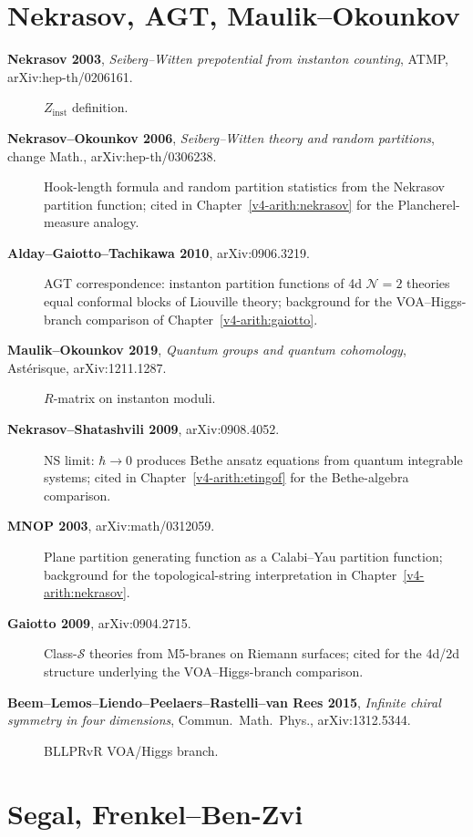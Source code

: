\section{Nekrasov, AGT, Maulik--Okounkov}
\label{v4-arith:app:A:nekrasov}

\begin{description}
\item[\textbf{Nekrasov 2003}, \emph{Seiberg--Witten prepotential from
instanton counting}, ATMP, arXiv:hep-th/0206161.] \(Z_{\mathrm{inst}}\)
definition.
\item[\textbf{Nekrasov--Okounkov 2006}, \emph{Seiberg--Witten theory
and random partitions}, change Math., arXiv:hep-th/0306238.]
Hook-length formula and random partition statistics from
the Nekrasov partition function; cited in
Chapter~\ref{v4-arith:nekrasov} for the Plancherel-measure
analogy.
\item[\textbf{Alday--Gaiotto--Tachikawa 2010}, arXiv:0906.3219.]
AGT correspondence: instanton partition functions of 4d
\(\mathcal{N}=2\) theories equal conformal blocks of Liouville
theory; background for the VOA--Higgs-branch comparison of
Chapter~\ref{v4-arith:gaiotto}.
\item[\textbf{Maulik--Okounkov 2019}, \emph{Quantum groups and
quantum cohomology}, Ast\'erisque, arXiv:1211.1287.] \(R\)-matrix on
instanton moduli.
\item[\textbf{Nekrasov--Shatashvili 2009}, arXiv:0908.4052.] NS
limit: \(\hbar\to 0\) produces Bethe ansatz equations from
quantum integrable systems; cited in
Chapter~\ref{v4-arith:etingof} for the Bethe-algebra comparison.
\item[\textbf{MNOP 2003}, arXiv:math/0312059.] Plane partition
generating function as a Calabi--Yau partition function; background
for the topological-string interpretation in
Chapter~\ref{v4-arith:nekrasov}.
\item[\textbf{Gaiotto 2009}, arXiv:0904.2715.] Class-\(\mathcal{S}\)
theories from M5-branes on Riemann surfaces; cited for the
4d/2d structure underlying the VOA--Higgs-branch comparison.
\item[\textbf{Beem--Lemos--Liendo--Peelaers--Rastelli--van Rees 2015},
\emph{Infinite chiral symmetry in four dimensions},
Commun.~Math.~Phys., arXiv:1312.5344.] BLLPRvR VOA/Higgs branch.
\end{description}

\section{Segal, Frenkel--Ben-Zvi}
\label{v4-arith:app:A:segal-fbz}

